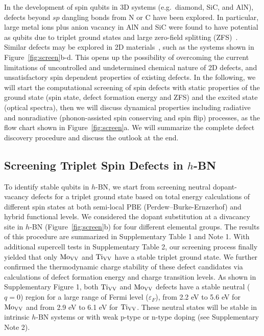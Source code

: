 In the development of spin qubits in 3D systems (e.g.\ diamond, SiC, and AlN), defects beyond $sp$ dangling bonds from N or C have been explored. In particular, large metal ions plus anion vacancy in AlN and SiC were found to have potential as qubits due to triplet ground states and large zero-field splitting (ZFS)~\cite{seo2017designing}.
Similar defects may be explored in 2D materials~\cite{turiansky2019dangling}, such as the systems shown in Figure~\ref{fig:screen}b-d.
This opens up the possibility of overcoming the current limitations of uncontrolled and undetermined chemical nature of 2D defects, and unsatisfactory spin dependent properties of existing defects.
In the following, we will start the computational screening of spin defects with static properties of the ground state (spin state, defect formation energy and ZFS) and the excited state (optical spectra), then we will discuss dynamical properties including radiative and nonradiative (phonon-assisted spin conserving and spin flip) processes, as the flow chart shown in Figure~\ref{fig:screen}a. We will summarize the complete defect discovery procedure and discuss the outlook at the end.

\subsection{Screening Triplet Spin Defects in $h$-BN}
To identify stable qubits in $h$-BN, we start from screening neutral dopant-vacancy defects for a triplet ground state based on total energy calculations of different spin states at both semi-local PBE (Perdew–Burke-Ernzerhof) and hybrid functional levels. We considered the dopant substitution at a divacancy site in $h$-BN (Figure~\ref{fig:screen}b) for four different elemental groups. The results of this procedure are summarized in Supplementary Table 1 and Note 1. With additional supercell tests in Supplementary Table 2, our screening process finally yielded that only $\text{Mo}_{\text{V}\text{V}}$ and $\text{Ti}_{\text{V}\text{V}}$ have a stable triplet ground state.
We further confirmed the thermodynamic charge stability of these defect candidates via calculations of defect formation energy and charge transition levels.
As shown in Supplementary Figure 1,
both $\text{Ti}_{\text{V}\text{V}}$ and $\text{Mo}_{\text{V}\text{V}}$ defects have a stable neutral ($q=0$) region for a large range of Fermi level ($\varepsilon_F$), from 2.2 eV to 5.6 eV for $\text{Mo}_{\text{V}\text{V}}$ and from 2.9 eV to 6.1 eV for $\text{Ti}_{\text{V}\text{V}}$. These neutral states will be stable in intrinsic $h$-BN systems or with weak p-type or n-type doping (see Supplementary Note 2).

